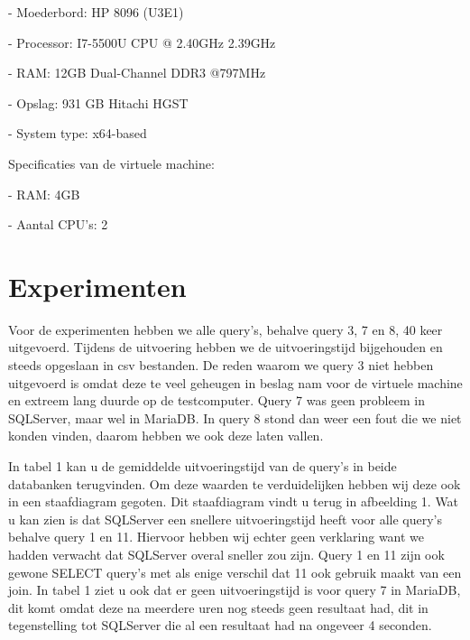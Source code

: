 \documentclass[fleqn,10pt]{artikeltin}
\begin{document}
-	Moederbord: HP 8096 (U3E1)

\vspace{5mm} %

-	Processor: I7-5500U CPU @ 2.40GHz 2.39GHz

\vspace{5mm} %

-	RAM: 12GB Dual-Channel DDR3 @797MHz

\vspace{5mm} %

-	Opslag: 931 GB Hitachi HGST

\vspace{5mm} %

-	System type: x64-based 

\vspace{10mm} %

Specificaties van de virtuele machine:

\vspace{10mm} %

-	RAM: 4GB

\vspace{5mm} %

-	Aantal CPU’s: 2

\vspace{5mm} %


\section{Experimenten}
\label{sec:experimenten}

Voor de experimenten hebben we alle query’s, behalve query 3, 7 en 8, 40 keer uitgevoerd. Tijdens de uitvoering hebben we de uitvoeringstijd bijgehouden en steeds opgeslaan in csv bestanden. De reden waarom we query 3 niet hebben uitgevoerd is omdat deze te veel geheugen in beslag nam voor de virtuele machine en extreem lang duurde op de testcomputer. Query 7 was geen probleem in SQLServer, maar wel in MariaDB. In query 8 stond dan weer een fout die we niet konden vinden, daarom hebben we ook deze laten vallen.

In tabel 1 kan u de gemiddelde uitvoeringstijd van de query’s in beide databanken terugvinden. Om deze waarden te verduidelijken hebben wij deze ook in een staafdiagram gegoten. Dit staafdiagram vindt u terug in afbeelding 1. Wat u kan zien is dat SQLServer een snellere uitvoeringstijd heeft voor alle query’s behalve query 1 en 11. Hiervoor hebben wij echter geen verklaring want we hadden verwacht dat SQLServer overal sneller zou zijn. Query 1 en 11 zijn ook gewone SELECT query’s met als enige verschil dat 11 ook gebruik maakt van een join. In tabel 1 ziet u ook dat er geen uitvoeringstijd is voor query 7 in MariaDB, dit komt omdat deze na meerdere uren nog steeds geen resultaat had, dit in tegenstelling tot SQLServer die al een resultaat had na ongeveer 4 seconden.
\end{document}
